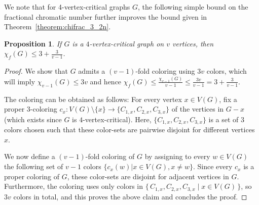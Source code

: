 \documentclass[fontsize=11pt,a4paper,DIV12]{scrartcl}
\newtheorem{proposition}[theorem]{Proposition}
\begin{document}
We note that for 4-vertex-critical graphs $G$, the following simple bound on
the fractional chromatic number further improves the bound given in
Theorem~\ref{theorem:chifrac_3_2n}.

\begin{proposition}
  
  If $G$ is a $4$-vertex-critical graph on $v$ vertices, then
  $\chi_f(G) \le 3+\frac{3}{v-1}$.
\end{proposition}
\begin{proof}
  We show that $G$ admits a $(v-1)$-fold coloring using $3v$ colors, which
  will imply $\chi_{v-1}(G) \le 3v$ and hence
  $\chi_f(G) \le \frac{\chi_{v-1}(G)}{v-1}\le \frac{3v}{v-1}=3+\frac{3}{v-1}$.
    
  The coloring can be obtained as follows: For every vertex $x \in V(G)$, fix
  a proper $3$-coloring
  $c_x:V(G) \setminus \{x\} \rightarrow \{C_{1,x},C_{2,x},C_{3,x}\}$ of the
  vertices in $G-x$ (which exists since $G$ is $4$-vertex-critical). Here,
  $\{C_{1,x},C_{2,x},C_{3,x}\}$ is a set of $3$ colors chosen such that these
  color-sets are pairwise disjoint for different vertices $x$.
    
  We now define a $(v-1)$-fold coloring of $G$ by assigning to every
  $w \in V(G)$ the following set of $v-1$ colors
  $\{c_x(w)|x \in V(G), x \neq w\}$. Since every $c_x$ is a proper coloring of
  $G$, these color-sets are disjoint for adjacent vertices in
  $G$. Furthermore, the coloring uses only colors in
  $\{\, C_{1,x},C_{2,x},C_{3,x} \mid x \in V(G) \,\}$, so $3v$ colors in total, and this
  proves the above claim and concludes the proof.
\end{proof}
\end{document}
